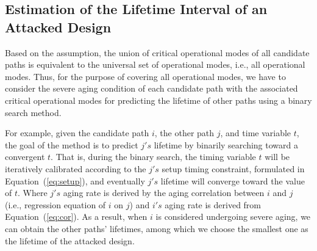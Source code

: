 \subsection{Estimation of the Lifetime Interval of an Attacked Design}
Based on the assumption, the union of critical operational modes of all candidate paths is equivalent to the universal set of operational modes, i.e., all operational modes. Thus, for the purpose of covering all operational modes, we have to consider the severe aging condition of each candidate path with the associated critical operational modes for predicting the lifetime of other paths using a binary search method.

For example, given the candidate path $i$, the other path $j$, and time variable $t$, the goal of the method is to predict $j's$ lifetime by binarily searching toward a convergent $t$. That is, during the binary search, the timing variable $t$ will be iteratively calibrated according to the $j's$ setup timing constraint, formulated in Equation~(\ref{eq:setup}), and eventually $j's$ lifetime will converge toward the value of $t$. Where $j's$ aging rate is derived by the aging correlation between $i$ and $j$ (i.e., regression equation of $i$ on $j$) and $i's$ aging rate is derived from Equation~(\ref{eq:cor}). 
As a result, when $i$ is considered undergoing severe aging, we can obtain the other paths' lifetimes, among which we choose the smallest one as the lifetime of the attacked design.
\begin{comment}
\subsection{Estimation of the Lifetime Interval of an Attacked Design}
To cover all operational modes while estimating lifetime interval, we have to consider the severe aging condition of each candidate path with the associated critical operational modes for predicting the lifetime of other paths using a binary search method.
For example, given the candidate path $i$, the other path $j$, and time variable $t$, during the binary search, $t$ will be iteratively calibrated according to the $j's$ setup timing constraint, formulated in Equation~(\ref{eq:setup}), and eventually $j's$ lifetime will converge toward the value of $t$. %
\end{comment}


